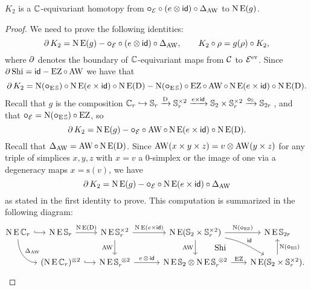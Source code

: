 \begin{lemma}\label{l:K2}
	$K_2$ is a $\cyc$-equivariant homotopy from $\bcomp_{\BE} \comp (e \ot \id) \comp \Delta_{\AW}$ to $\chains\EE(g)$.
\end{lemma}

\begin{proof}
	We need to prove the following identities:
	\[
	\bd K_2 = \chains\EE(g) - \bcomp_{\BE} \comp (e \ot \id) \comp \Delta_{\AW},
	\qquad
	K_2 \comp \rho = g(\rho) \comp K_2,
	\]
	where $\bd$ denotes the boundary of $\cyc$-equivariant maps from $\cC$ to $\BE^\ev$.
	Since $\bd \Shi = \id - \EZ \comp \AW$ we have that
	\[
	\bd K_2 =
	\chains(\bcomp_{\EE\sym}) \comp \chains\EE(e \times \id) \comp \chains\EE(\rD) -
	\chains(\bcomp_{\EE\sym}) \comp \EZ \comp \AW \comp \chains\EE(e \times \id) \comp \chains\EE(\rD).
	\]
	Recall that $g$ is the composition $\cyc_r \hookrightarrow \sym_r \xra{\rD} \sym_r^{\times 2} \xra{e \times \id} \sym_2 \times \sym_r^{\times 2} \xra{\bcomp_{\sym}} \sym_{2r}$\,, and that $\bcomp_{\BE} = \chains(\bcomp_{\EE\sym}) \comp \EZ$, so
	\[
	\bd K_2 =
	\chains\EE(g) -
	\bcomp_{\BE} \comp \AW \comp \chains\EE(e \times \id) \comp \chains\EE(\rD).
	\]
	Recall that $\Delta_{\AW} = \AW \comp \chains\EE(\rD)$.
	Since $\AW(x \times y \times z) = v \ot \AW(y \times z)$ for any triple of simplices $x,y,z$ with $x = v$ a $0$-simplex or the image of one via a degeneracy maps $x = \mathrm{s}(v)$, we have
	\[
	\bd K_2 =
	\chains\EE(g) -
	\bcomp_{\BE} \comp \chains\EE(e \times \id) \comp \Delta_{\AW}
	\]
	as stated in the first identity to prove.
	This computation is summarized in the following diagram:
	\[
	\hspace*{-4pt}
	\begin{tikzcd}
		\chains\EE\cyc_r
		\rar[hook]
		\arrow[dr,in=180,out=-90,"\Delta_{\AW}"]
		&[-20pt]
		\chains\EE\sym_r
		\rar["\chains\EE(\rD)"] &[-10pt]
		\chains\EE\sym_r^{\times 2}
		\rar["\chains\EE(e \times \id)"]
		\dar["\AW"'] &[7pt]
		\chains\EE(\sym_2 \times \sym_r^{\times 2})
		\rar["\chains(\bcomp_{\EE\!\sym})"]
		\dar["\AW"']
		\drar["\id",out=-10,in=150] &[-5pt]
		\chains\EE\sym_{2r} \\ &
		(\chains\EE\cyc_r)^{\ot 2}
		\arrow[r,hook] &
		\chains\EE\sym_r^{\ \ot 2}
		\rar["e \,\ot\, \id"] &
		\chains\EE\sym_2 \ot \chains\EE\sym_r^{\ \ot 2}
		\rar["\EZ"]
		\uar["\Shi",phantom,shift right=30pt] &
		\chains\EE(\sym_2 \times \sym_r^{\times 2}).
		\uar["\chains(\bcomp_{\EE\!\sym})"']
	\end{tikzcd}
	\]


\end{proof}
